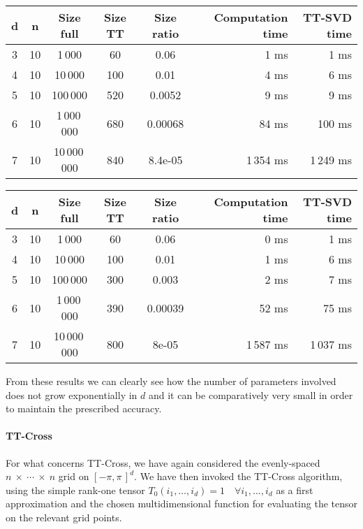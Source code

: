 \begin{center}
  \begin{tabular}[t]{cccccrr}
    \toprule
    d & n  & Size full & Size TT & Size ratio & Computation time & TT-SVD time\\ \midrule
    3 & 10 & 1\,000      &60&0.06 & 1 ms & 1 ms\\
    4 & 10 & 10\,000     &100&0.01 & 4 ms & 6 ms\\
    5 & 10 & 100\,000    &520&0.0052 & 9 ms & 9 ms\\
    6 & 10 & 1\,000\,000   &680&0.00068 & 84 ms & 100 ms\\
    7 & 10 & 10\,000\,000  &840&8.4e-05& 1\,354 ms & 1\,249 ms\\ \bottomrule
  \end{tabular}
\end{center}

\begin{center}
  \begin{tabular}[t]{cccccrr}
    \toprule
    d & n  & Size full & Size TT & Size ratio & Computation time & TT-SVD time\\ \midrule
    3 & 10 & 1\,000      &60&0.06& 0 ms & 1 ms\\
    4 & 10 & 10\,000     &100&0.01& 1 ms & 6 ms\\
    5 & 10 & 100\,000    &300&0.003& 2 ms & 7 ms\\
    6 & 10 & 1\,000\,000   &390&0.00039& 52 ms & 75 ms\\
    7 & 10 & 10\,000\,000  &800&8e-05& 1\,587 ms & 1\,037 ms\\ \bottomrule
  \end{tabular}
\end{center}

From these results we can clearly see how the number of parameters involved does not grow exponentially in $d$ and it can be comparatively very small in order to maintain the prescribed accuracy.

\paragraph{TT-Cross}
For what concerns TT-Cross, we have again considered the evenly-spaced $n~\times~\cdots~\times~n$ grid on $[-\pi,\pi\,]^d$. We have then invoked the TT-Cross algorithm, using the simple rank-one tensor $T_0(i_1,\ldots,i_d) = 1 \quad \forall i_1,\ldots,i_d$ as a first approximation and the chosen multidimensional function for evaluating the tensor on the relevant grid points.

